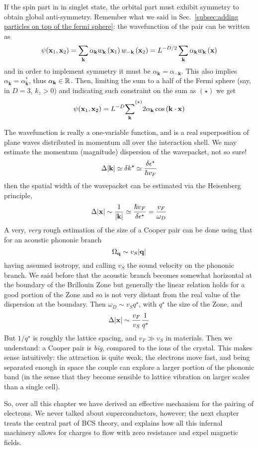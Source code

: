 If the spin part in in singlet state, the orbital part must exhibit symmetry to obtain global anti-symmetry. Remember what we said in Sec.~\ref{subsec:adding particles on top of the fermi sphere}: the wavefunction of the pair can be written as
\[
	\psi(\mathbf{x}_1,\mathbf{x}_2) =  \sum_\mathbf{k} \alpha_\mathbf{k} w_\mathbf{k} \left({\mathbf{x}_1}\right) w_{-\mathbf{k}} \left({\mathbf{x}_2}\right) = L^{-D/2} \sum_\mathbf{k} \alpha_\mathbf{k} w_\mathbf{k} \left({\mathbf{x}}\right)
\]
and in order to implement symmetry it must be $\alpha_\mathbf{k} = \alpha_{-\mathbf{k}}$. This also implies $\alpha_\mathbf{k}=\alpha_\mathbf{k}^*$, thus $\alpha_\mathbf{k} \in \mathbb{R}$. Then, limiting the sum to a half of the Fermi sphere (say, in $D=3$, $k_z > 0$) and indicating such constraint on the sum as $(\star)$ we get
\[
	\psi(\mathbf{x}_1,\mathbf{x}_2) = L^{-D} {\sum_\mathbf{k}^{}}^{(\star)} 2 \alpha_\mathbf{k} \cos\left({\mathbf{k}\cdot\mathbf{x}}\right)
\]
{\color{red}The wavefunction is really a one-variable function, and is a real superposition of plane waves distributed in momentum all over the interaction shell. We may estimate the momentum (magnitude) dispersion of the wavepacket,
{\color{red}not so sure!}
\[
	\Delta \abs{\mathbf{k}} \simeq \delta k^\star \simeq \frac{\delta\epsilon^\star}{\hbar v_F}
\]
then the spatial width of the wavepacket can be estimated via the Heisenberg principle,
\[
	\Delta\abs{\mathbf{x}} \sim \frac{1}{\abs{\mathbf{k}}} \simeq \frac{\hbar v_F}{\delta\epsilon^\star} = \frac{v_F}{\omega_D}
\]
A very, \textit{very} rough estimation of the size of a Cooper pair can be done using that for an acoustic phononic branch
\[
	\Omega_\mathbf{q} \sim v_S \abs{\mathbf{q}}
\]
having assumed isotropy, and calling $v_S$ the sound velocity on the phononic branch. We said before that the acoustic branch becomes somewhat horizontal at the boundary of the Brillouin Zone but generally the linear relation holds for a good portion of the Zone and so is not very distant from the real value of the dispersion at the boundary. Then $\omega_D \sim v_S q^\star$, with $q^\star$ the size of the Zone, and
\[
	\Delta\abs{\mathbf{x}} \sim \frac{v_F}{v_S} \frac{1}{q^\star}
\]
But $1/q^\star$ is roughly the lattice spacing, and $v_F \gg v_S$ in materials. Then we understand: a Cooper pair is \textit{big}, compared to the ions of the crystal. This makes sense intuitively: the attraction is quite weak, the electrons move fast, and being separated enough in space the couple can explore a larger portion of the phononic band (in the sense that they become sensible to lattice vibration on larger scales than a single cell).

So, over all this chapter we have derived an effective mechanism for the pairing of electrons. We never talked about superconductors, however; the next chapter treats the central part of BCS theory, and explains how all this infernal machinery allows for charges to flow with zero resistance and expel magnetic fields.}